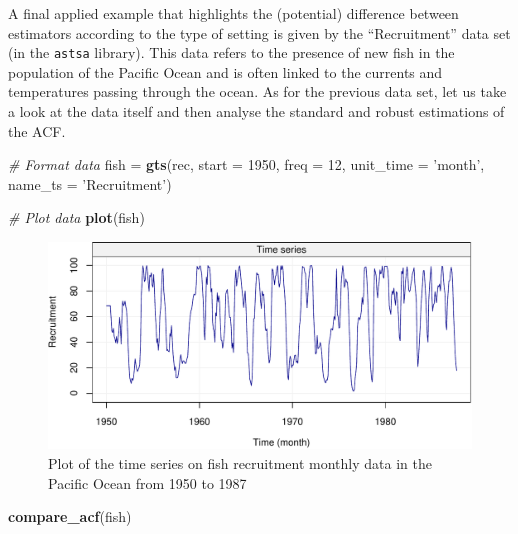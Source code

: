 \documentclass[]{book}
\newenvironment{Shaded}{\begin{snugshade}}{\end{snugshade}}
\newcommand{\KeywordTok}[1]{\textcolor[rgb]{0.13,0.29,0.53}{\textbf{#1}}}
\newcommand{\DataTypeTok}[1]{\textcolor[rgb]{0.13,0.29,0.53}{#1}}
\newcommand{\DecValTok}[1]{\textcolor[rgb]{0.00,0.00,0.81}{#1}}
\newcommand{\StringTok}[1]{\textcolor[rgb]{0.31,0.60,0.02}{#1}}
\newcommand{\CommentTok}[1]{\textcolor[rgb]{0.56,0.35,0.01}{\textit{#1}}}
\newcommand{\NormalTok}[1]{#1}
\theoremstyle{definition}
\theoremstyle{definition}
\theoremstyle{definition}
\theoremstyle{remark}
\begin{document}
A final applied example that highlights the (potential) difference
between estimators according to the type of setting is given by the
``Recruitment'' data set (in the \texttt{astsa} library). This data
refers to the presence of new fish in the population of the Pacific
Ocean and is often linked to the currents and temperatures passing
through the ocean. As for the previous data set, let us take a look at
the data itself and then analyse the standard and robust estimations of
the ACF.

\begin{Shaded}
\begin{Highlighting}[]
\CommentTok{# Format data}
\NormalTok{fish =}\StringTok{ }\KeywordTok{gts}\NormalTok{(rec, }\DataTypeTok{start =} \DecValTok{1950}\NormalTok{, }\DataTypeTok{freq =} \DecValTok{12}\NormalTok{, }\DataTypeTok{unit_time =} \StringTok{'month'}\NormalTok{, }\DataTypeTok{name_ts =} \StringTok{'Recruitment'}\NormalTok{)}

\CommentTok{# Plot data}
\KeywordTok{plot}\NormalTok{(fish)}
\end{Highlighting}
\end{Shaded}

\begin{figure}

{\centering \includegraphics{ts_files/figure-latex/unnamed-chunk-35-1} 

}

\caption{Plot of the time series on fish recruitment monthly data in the Pacific Ocean from 1950 to 1987}\label{fig:unnamed-chunk-35}
\end{figure}

\begin{Shaded}
\begin{Highlighting}[]
\KeywordTok{compare_acf}\NormalTok{(fish)}
\end{Highlighting}
\end{Shaded}
\end{document}

